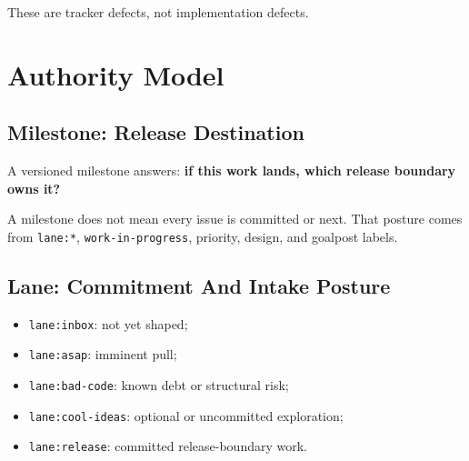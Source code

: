 These are tracker defects, not implementation defects.

\section{Authority Model}\label{record-249-authority-model}

\subsection{Milestone: Release Destination}\label{record-249-milestone-release-destination}

A versioned milestone answers: \textbf{if this work lands, which release boundary owns it?}

A milestone does not mean every issue is committed or next. That posture comes from \texttt{l\allowbreak{}a\allowbreak{}n\allowbreak{}e\allowbreak{}:\allowbreak{}*}, \texttt{w\allowbreak{}o\allowbreak{}r\allowbreak{}k\allowbreak{}-\allowbreak{}i\allowbreak{}n\allowbreak{}-\allowbreak{}p\allowbreak{}r\allowbreak{}o\allowbreak{}g\allowbreak{}r\allowbreak{}e\allowbreak{}s\allowbreak{}s}, priority, design, and goalpost labels.

\subsection{Lane: Commitment And Intake Posture}\label{record-249-lane-commitment-and-intake-posture}

\begin{itemize}
\tightlist
\item
  \texttt{l\allowbreak{}a\allowbreak{}n\allowbreak{}e\allowbreak{}:\allowbreak{}i\allowbreak{}n\allowbreak{}b\allowbreak{}o\allowbreak{}x}: not yet shaped;
\item
  \texttt{l\allowbreak{}a\allowbreak{}n\allowbreak{}e\allowbreak{}:\allowbreak{}a\allowbreak{}s\allowbreak{}a\allowbreak{}p}: imminent pull;
\item
  \texttt{l\allowbreak{}a\allowbreak{}n\allowbreak{}e\allowbreak{}:\allowbreak{}b\allowbreak{}a\allowbreak{}d\allowbreak{}-\allowbreak{}c\allowbreak{}o\allowbreak{}d\allowbreak{}e}: known debt or structural risk;
\item
  \texttt{l\allowbreak{}a\allowbreak{}n\allowbreak{}e\allowbreak{}:\allowbreak{}c\allowbreak{}o\allowbreak{}o\allowbreak{}l\allowbreak{}-\allowbreak{}i\allowbreak{}d\allowbreak{}e\allowbreak{}a\allowbreak{}s}: optional or uncommitted exploration;
\item
  \texttt{l\allowbreak{}a\allowbreak{}n\allowbreak{}e\allowbreak{}:\allowbreak{}r\allowbreak{}e\allowbreak{}l\allowbreak{}e\allowbreak{}a\allowbreak{}s\allowbreak{}e}: committed release-boundary work.
\end{itemize}

